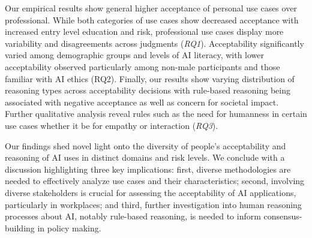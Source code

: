 Our empirical results show general higher acceptance of personal use cases over professional. While both categories of use cases show decreased acceptance with increased entry level education and risk, professional use cases display more variability and disagreements across judgments (\textit{RQ1}). Acceptability significantly varied among demographic groups and levels of AI literacy, with lower acceptability observed particularly among non-male participants and those familiar with AI ethics (RQ2). Finally, our results show varying distribution of reasoning types across acceptability decisions with rule-based reasoning being associated with negative acceptance as well as concern for societal impact. Further qualitative analysis reveal rules such as the need for humanness in certain use cases whether it be for empathy or interaction (\textit{RQ3}). 

Our findings shed novel light onto the diversity of people's acceptability and reasoning of AI uses in distinct domains and risk levels. We conclude with a discussion highlighting three key implications: first, diverse methodologies are needed to effectively analyze use cases and their characteristics; second, involving diverse stakeholders is crucial for assessing the acceptability of AI applications, particularly in workplaces; and third, further investigation into human reasoning processes about AI, notably rule-based reasoning, is needed to inform consensus-building in policy making. 
